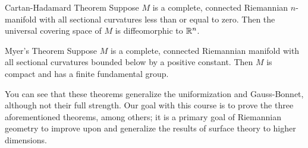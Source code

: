 \begin{namedthm}{Cartan-Hadamard Theorem}
   Suppose $M$ is a complete, connected Riemannian $n$-manifold with all sectional curvatures less than or equal to zero. Then the universal covering space of $M$ is diffeomorphic to $\mathbb{R}^n $. 
\end{namedthm}
\begin{namedthm}{Myer's Theorem}
    Suppose $M$ is a complete, connected Riemannian manifold with all sectional curvatures bounded below by a positive constant. Then $M$ is compact and has a finite fundamental group. 
\end{namedthm}
You can see that these theorems generalize the uniformization and Gauss-Bonnet, although not their full strength. Our goal with this course is to prove the three aforementioned theorems, among others; it is a primary goal of Riemannian geometry to improve upon and generalize the results of surface theory to higher dimensions.
